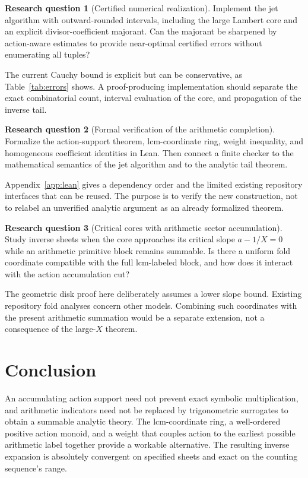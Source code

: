\documentclass[11pt,a4paper]{article}
\numberwithin{equation}{section}
\theoremstyle{definition}
\newtheorem{question}{Research question}
\theoremstyle{remark}
\begin{document}
\begin{question}[Certified numerical realization]
Implement the jet algorithm with outward-rounded intervals, including
the large Lambert core and an explicit divisor-coefficient majorant.
Can the majorant be sharpened by action-aware estimates to provide
near-optimal certified errors without enumerating all tuples?
\end{question}
The current Cauchy bound is explicit but can be conservative, as
Table~\ref{tab:errors} shows. A proof-producing implementation should
separate the exact combinatorial count, interval evaluation of the
core, and propagation of the inverse tail.

\begin{question}[Formal verification of the arithmetic completion]
Formalize the action-support theorem, lcm-coordinate ring, weight
inequality, and homogeneous coefficient identities in Lean. Then
connect a finite checker to the mathematical semantics of the jet
algorithm and to the analytic tail theorem.
\end{question}
Appendix~\ref{app:lean} gives a dependency order and the limited existing
repository interfaces that can be reused. The purpose is to verify the
new construction, not to relabel an unverified analytic argument as an
already formalized theorem.

\begin{question}[Critical cores with arithmetic sector accumulation]
Study inverse sheets when the core approaches its critical slope
$a-1/X=0$ while an arithmetic primitive block remains summable. Is there
a uniform fold coordinate compatible with the full lcm-labeled block,
and how does it interact with the action accumulation cut?
\end{question}
The geometric disk proof here deliberately assumes a lower slope bound.
Existing repository fold analyses concern other models. Combining such
coordinates with the present arithmetic summation would be a separate
extension, not a consequence of the large-$X$ theorem.

\section{Conclusion}

An accumulating action support need not prevent exact symbolic
multiplication, and arithmetic indicators need not be replaced by
trigonometric surrogates to obtain a summable analytic theory. The
lcm-coordinate ring, a well-ordered positive action monoid, and a weight
that couples action to the earliest possible arithmetic label together
provide a workable alternative. The resulting inverse expansion is
absolutely convergent on specified sheets and exact on the counting
sequence's range.
\end{document}
